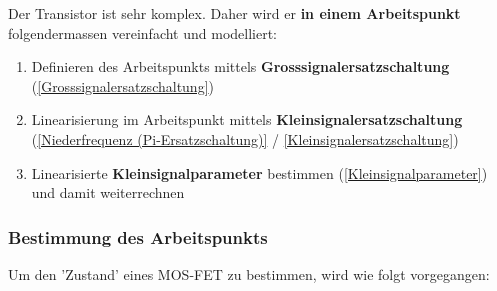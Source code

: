 Der Transistor ist sehr komplex.
Daher wird er \textbf{in einem Arbeitspunkt} folgendermassen vereinfacht  und modelliert:

\begin{enumerate}
    \item Definieren des Arbeitspunkts mittels \textbf{Grosssignalersatzschaltung} (\ref{Grosssignalersatzschaltung})
    \item Linearisierung im Arbeitspunkt mittels \textbf{Kleinsignalersatzschaltung} (\ref{Niederfrequenz (Pi-Ersatzschaltung)} / \ref{Kleinsignalersatzschaltung})
    \item Linearisierte \textbf{Kleinsignalparameter} bestimmen (\ref{Kleinsignalparameter}) und damit weiterrechnen
\end{enumerate}


\subsubsection{Bestimmung des Arbeitspunkts}
\label{Bestimmung des Arbeitspunkts}
Um den 'Zustand' eines MOS-FET zu bestimmen, wird wie folgt vorgegangen:

\smallskip

